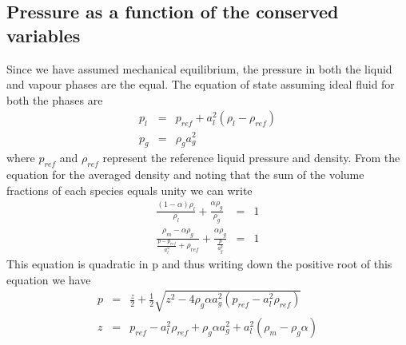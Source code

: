 \documentclass[a4paper,16pt]{article}
\begin{document}
\subsection{Pressure as a function of the conserved variables}
Since we have assumed mechanical equilibrium, the pressure in both the liquid and vapour phases are the equal. The equation of state assuming ideal fluid for both the phases are
\begin{eqnarray}
p_l &=& p_{ref} + a_l^2(\rho_l-\rho_{ref})\\
p_g &=& \rho_g a_g^2
\end{eqnarray}
where $p_{ref}$ and $\rho_{ref}$ represent the reference liquid pressure and density.  From the equation for the averaged density and noting that the sum of the volume fractions of each species equals unity we can write
\begin{eqnarray}
\frac{(1-\alpha)\rho_l}{\rho_l} + \frac{\alpha\rho_g}{\rho_g} &=& 1\\
\frac{\rho_m - \alpha\rho_g}{\frac{p - p_{ref}}{a_l^2} + \rho_{ref}} + \frac{\alpha\rho_g}{\frac{p}{a_g^2}}&=& 1
\end{eqnarray}
This equation is quadratic in p and thus writing down the positive root of this equation we have
\begin{eqnarray}
p &=& \frac{z}{2} + \frac{1}{2}\sqrt{z^2 - 4\rho_g \alpha a_g^2(p_{ref} - a_l^2 \rho_{ref})} \\
z &=& p_{ref} - a_l^2\rho_{ref} + \rho_g \alpha a_g^2 +  a_l^2(\rho_m - \rho_g \alpha)
\end{eqnarray}
\end{document}
